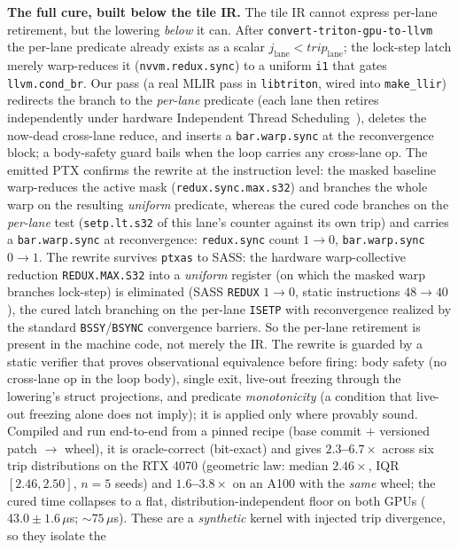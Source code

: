 \documentclass[sigplan,10pt]{acmart}
\begin{document}
\textbf{The full cure, built below the tile IR.} The tile IR cannot express per-lane retirement, but the
lowering \emph{below} it can. After \texttt{convert-triton-gpu-to-llvm} the per-lane predicate already
exists as a scalar $j_{\mathrm{lane}}<\mathit{trip}_{\mathrm{lane}}$; the lock-step latch merely
warp-reduces it (\texttt{nvvm.redux.sync}) to a uniform \texttt{i1} that gates \texttt{llvm.cond\_br}. Our
pass (a real MLIR pass in \texttt{libtriton}, wired into \texttt{make\_llir}) redirects the branch to the
\emph{per-lane} predicate (each lane then retires independently under hardware Independent Thread Scheduling~\cite{its2017}), deletes the now-dead cross-lane reduce, and inserts a \texttt{bar.warp.sync} at the
reconvergence block; a body-safety guard bails when the loop carries any cross-lane op. The emitted PTX confirms the rewrite at the instruction level: the masked baseline warp-reduces the active mask (\texttt{redux.sync.max.s32}) and branches the whole warp on the resulting \emph{uniform} predicate, whereas the cured code branches on the \emph{per-lane} test (\texttt{setp.lt.s32} of this lane's counter against its own trip) and carries a \texttt{bar.warp.sync} at reconvergence: \texttt{redux.sync} count $1\!\rightarrow\!0$, \texttt{bar.warp.sync} $0\!\rightarrow\!1$. The rewrite survives \texttt{ptxas} to SASS: the hardware warp-collective reduction \texttt{REDUX.MAX.S32} into a \emph{uniform} register (on which the masked warp branches lock-step) is eliminated (SASS \texttt{REDUX} $1\!\rightarrow\!0$, static instructions $48\!\rightarrow\!40$), the cured latch branching on the per-lane \texttt{ISETP} with reconvergence realized by the standard \texttt{BSSY}/\texttt{BSYNC} convergence barriers. So the per-lane retirement is present in the machine code, not merely the IR. The rewrite is guarded by a static verifier that proves observational equivalence before firing: body safety (no cross-lane op in the loop body), single exit, live-out freezing through the lowering's struct projections, and predicate \emph{monotonicity} (a condition that live-out freezing alone does not imply); it is applied only where provably sound. Compiled and run
end-to-end from a pinned recipe (base commit $+$ versioned patch $\rightarrow$ wheel), it is
oracle-correct (bit-exact) and gives \textbf{$2.3$--$6.7\times$} across six trip distributions on the
RTX 4070 (geometric law: median $2.46\times$, IQR $[2.46,2.50]$, $n{=}5$ seeds) and
\textbf{$1.6$--$3.8\times$} on an A100 with the \emph{same} wheel; the cured time collapses to a flat,
distribution-independent floor on both GPUs ($43.0\pm1.6\,\mu$s; ${\sim}75\,\mu$s). These are a \emph{synthetic} kernel with injected trip divergence, so they isolate the
\end{document}
